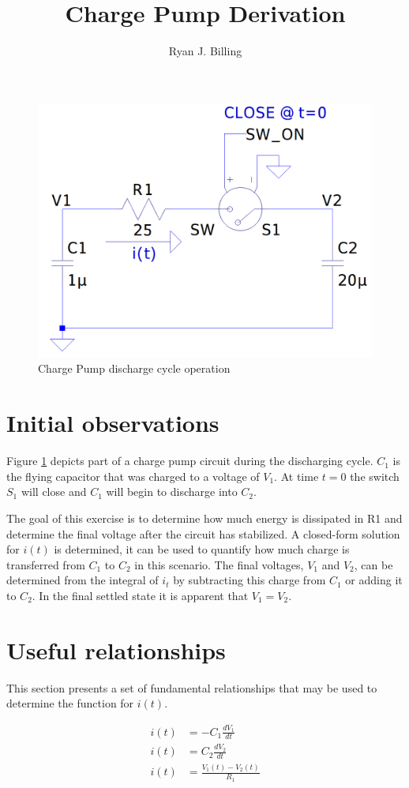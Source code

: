 \documentclass[12pt,letterpaper]{report}
\title{Charge Pump Derivation}
\author{Ryan J. Billing}
\begin{document}
	\maketitle
	\begin{figure}
		\centering
		\includegraphics[width=0.7\linewidth]{img/charge_pump_discharge_cycle}
		\caption{Charge Pump discharge cycle operation}
		\label{fig:chargepumpdischargecycle}
	\end{figure}
	
	\section{Initial observations}
	Figure \ref{fig:chargepumpdischargecycle} depicts part of a charge pump circuit during the discharging cycle.  $C_1$ is the flying capacitor that was charged to a voltage of $V_1$.  At time $t=0$ the switch $S_1$ will close and $C_1$ will begin to discharge into $C_2$.
	
	The goal of this exercise is to determine how much energy is dissipated in R1 and determine the final voltage after the circuit has stabilized.  A closed-form solution for $i(t)$ is determined, it can be used to quantify how much charge is transferred from $C_1$ to $C_2$ in this scenario.   The final voltages, $V_1$ and $V_2$, can be determined from the integral of $i_t$ by subtracting this charge from $C_1$ or adding it to $C_2$.  In the final settled state it is apparent that $V_1 = V_2$.
	
	\section{Useful relationships}
	This section presents a set of fundamental relationships that may be used to determine the function for $i(t)$.
	
	\begin{align}
		i(t) &= -C_1 \frac{dV_1}{dt} \label{c1deriv} \\
		i(t) &= C_2 \frac{dV_2}{dt} \label{c2deriv} \\
		i(t) &= \frac{V_1(t) - V_2(t)}{R_1} \label{itV}
	\end{align}
\end{document}
